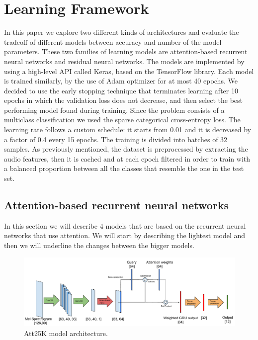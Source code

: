 \section{Learning Framework}
\label{sec:learning_framework}

In this paper we explore two different kinds of architectures and evaluate the tradeoff of different models between accuracy and number of the model parameters. These two families of learning models are attention-based recurrent neural networks and residual neural networks.
The models are implemented by using a high-level API called Keras, based on the TensorFlow library.
Each model is trained similarly, by the use of Adam optimizer \cite{8} for at most 40 epochs. We decided to use the early stopping technique that terminates learning after 10 epochs in which the validation loss does not decrease, and then select the best performing model found during training. Since the problem consists of a multiclass classification we used the sparse categorical cross-entropy loss.
The learning rate follows a custom schedule: it starts from 0.01 and it is decreased by a factor of 0.4 every 15 epochs. The training is divided into batches of 32 samples. As previously mentioned, the dataset is preprocessed by extracting the audio features, then it is cached and at each epoch filtered in order to train with a balanced proportion between all the classes that resemble the one in the test set.



\subsection{Attention-based recurrent neural networks} 
In this section we will describe 4 models that are based on the recurrent neural networks that use attention. We will start by describing the lightest model and then we will underline the changes between the bigger models.

\begin{figure}[htbp]
\centerline{\includegraphics[scale=.5]{att.pdf}}
\caption{Att25K model architecture.}
\label{fig}
\end{figure}

